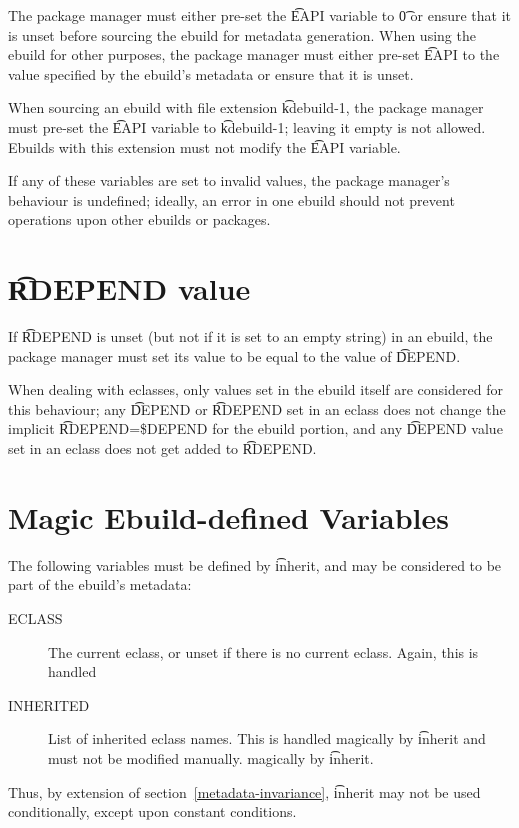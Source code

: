 The package manager must either pre-set the \t{EAPI} variable to \t{0} or ensure that it is unset
before sourcing the ebuild for metadata generation. When using the ebuild for other purposes, the
package manager must either pre-set \t{EAPI} to the value specified by the ebuild's metadata or
ensure that it is unset.

\IFKDEBUILDELSE
{
    When sourcing an ebuild with file extension \t{kdebuild-1}, the package manager must pre-set the
    \t{EAPI} variable to \t{kdebuild-1}; leaving it empty is not allowed. Ebuilds with this
    extension must not modify the \t{EAPI} variable.
}{
}

If any of these variables are set to invalid values, the package manager's behaviour is undefined;
ideally, an error in one ebuild should not prevent operations upon other ebuilds or packages.

\section{\t{RDEPEND} value}
\label{rdepend-depend}

If \t{RDEPEND} is unset (but not if it is set to an empty string) in an ebuild, the package manager
must set its value to be equal to the value of \t{DEPEND}.

When dealing with eclasses, only values set in the ebuild itself are considered for this behaviour;
any \t{DEPEND} or \t{RDEPEND} set in an eclass does not change the implicit \t{RDEPEND=\$DEPEND} for
the ebuild portion, and any \t{DEPEND} value set in an eclass does not get added to \t{RDEPEND}.

\section{Magic Ebuild-defined Variables}

The following variables must be defined by \t{inherit}, and may be considered to be part
of the ebuild's metadata:

\begin{description}
\item[ECLASS] The current eclass, or unset if there is no current eclass. Again, this is handled
\item[INHERITED] List of inherited eclass names. This is handled magically by \t{inherit} and
    must not be modified manually.
    magically by \t{inherit}.
\end{description}

\note Thus, by extension of section~\ref{metadata-invariance}, \t{inherit} may not be used
    conditionally, except upon constant conditions.


